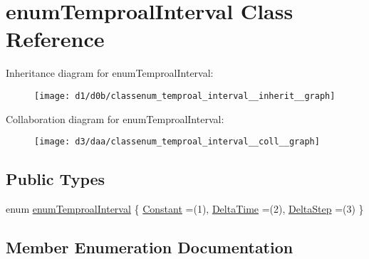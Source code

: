 \hypertarget{classenum_temproal_interval}{}\section{enum\+Temproal\+Interval Class Reference}
\label{classenum_temproal_interval}


Inheritance diagram for enum\+Temproal\+Interval\+:
\nopagebreak
\begin{figure}[H]
\begin{center}
\leavevmode
\texttt{[image: d1/d0b/classenum\_temproal\_interval\_\_inherit\_\_graph]}
\end{center}
\end{figure}


Collaboration diagram for enum\+Temproal\+Interval\+:
\nopagebreak
\begin{figure}[H]
\begin{center}
\leavevmode
\texttt{[image: d3/daa/classenum\_temproal\_interval\_\_coll\_\_graph]}
\end{center}
\end{figure}
\subsection*{Public Types}
\begin{DoxyCompactItemize}
\item 
enum \hyperlink{classenum_temproal_interval_a819867acc59e7bd40d70d396f0edd977}{enum\+Temproal\+Interval} \{ \hyperlink{classenum_temproal_interval_a819867acc59e7bd40d70d396f0edd977ad95ecbd1b93a410d8bd80956f1c132de}{Constant} =(1), 
\hyperlink{classenum_temproal_interval_a819867acc59e7bd40d70d396f0edd977a4a466aa1d407088d2d61b460caef7333}{Delta\+Time} =(2), 
\hyperlink{classenum_temproal_interval_a819867acc59e7bd40d70d396f0edd977a81a10633deb59ef15cd2731b69fb7180}{Delta\+Step} =(3)
 \}
\end{DoxyCompactItemize}


\subsection{Member Enumeration Documentation}
\mbox{\label{classenum_temproal_interval_a819867acc59e7bd40d70d396f0edd977}} 
